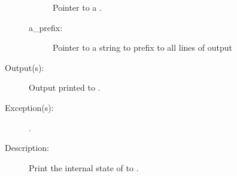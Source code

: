 \begin{description}
\begin{description}
\begin{description}
			Pointer to a .
		\item[a\_prefix: ]
			Pointer to a string to prefix to all lines of output
		\end{description}
	\item[Output(s): ]
		Output printed to .
	\item[Exception(s): ]
		\begin{description}\item[]
		\item[.]
		\end{description}
	\item[Description: ]
		Print the internal state of  to .
	\end{description}
\end{description}
